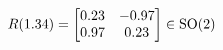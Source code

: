 \documentclass[preview]{standalone}
\begin{document}
\begin{align*}
\special{dvisvgm:raw <g id='unique000'>}R(1.34) = \begin{bmatrix} 0.23 & -0.97 \\ 0.97 & 0.23 \end{bmatrix} \in \text{SO}(2)\special{dvisvgm:raw </g>}
\end{align*}
\end{document}
